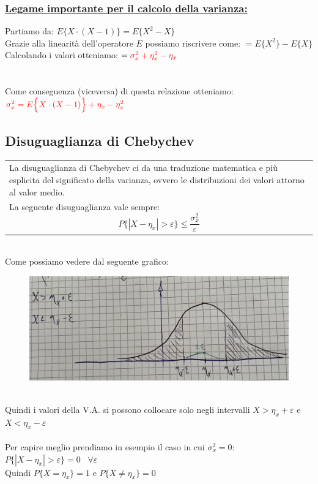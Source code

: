 \documentclass{article}
\begin{document}
\subsubsection{\underline{Legame importante per il calcolo della varianza:}}
Partiamo da: $E\Big\{ X \cdot (X-1) \Big\} = E\Big\{ X^2 - X \Big\}$ \\
Grazie alla linearità dell’operatore $E$ possiamo riscrivere come: $= E\Big\{ X^2 \Big\} - E \Big\{X \Big\}$ \\
Calcolando i valori otteniamo: $= \color{red}\sigma_x^2 + \eta_x^2 - \eta_x$ \\ \\ \\
Come conseguenza (viceversa) di questa relazione otteniamo: $\color{red}\sigma_x^2 = E\Big\{ X \cdot (X-1) \Big\} + \eta_x - \eta_x^2$

\subsection{Disuguaglianza di Chebychev}
\begin{tabular}{|p{13cm}}
La disuguaglianza di Chebychev ci da una traduzione matematica e più esplicita del significato della varianza, ovvero le distribuzioni dei valori attorno al valor medio. \\
La seguente disuguaglianza vale sempre:
\[P \big\{ |X - \eta_x| > \varepsilon \big\} \leq \frac{\sigma_x^2}{\varepsilon}\]
\end{tabular} \\
Come possiamo vedere dal seguente grafico:
\begin{figure}[ht]
\centering
\includegraphics[scale=0.09]{images/49.Chebychev.jpeg}
\end{figure} ~\\
Quindi i valori della V.A. si possono collocare solo negli intervalli $X > \eta_x + \varepsilon$ e $X < \eta_x - \varepsilon$ \\ \\
Per capire meglio prendiamo in esempio il caso in cui $\sigma_x^2 = 0$: \\
$P \big\{ |X - \eta_x| > \varepsilon \big\} = 0 \;\;\; \forall \varepsilon$ \\
Quindi $P \big\{ X = \eta_x\big\} = 1$ e $P \big\{ X \neq \eta_x\big\} = 0$
\end{document}

